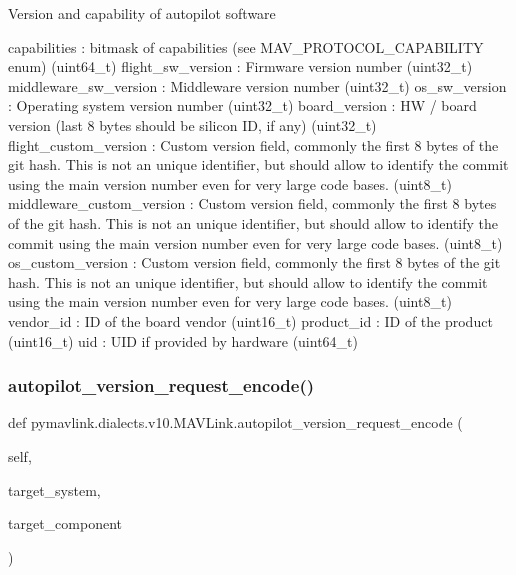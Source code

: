 \begin{DoxyVerb}Version and capability of autopilot software

capabilities              : bitmask of capabilities (see MAV_PROTOCOL_CAPABILITY enum) (uint64_t)
flight_sw_version         : Firmware version number (uint32_t)
middleware_sw_version        : Middleware version number (uint32_t)
os_sw_version             : Operating system version number (uint32_t)
board_version             : HW / board version (last 8 bytes should be silicon ID, if any) (uint32_t)
flight_custom_version        : Custom version field, commonly the first 8 bytes of the git hash. This is not an unique identifier, but should allow to identify the commit using the main version number even for very large code bases. (uint8_t)
middleware_custom_version        : Custom version field, commonly the first 8 bytes of the git hash. This is not an unique identifier, but should allow to identify the commit using the main version number even for very large code bases. (uint8_t)
os_custom_version         : Custom version field, commonly the first 8 bytes of the git hash. This is not an unique identifier, but should allow to identify the commit using the main version number even for very large code bases. (uint8_t)
vendor_id                 : ID of the board vendor (uint16_t)
product_id                : ID of the product (uint16_t)
uid                       : UID if provided by hardware (uint64_t)\end{DoxyVerb}
 \mbox{\label{classpymavlink_1_1dialects_1_1v10_1_1MAVLink_aa3ccba05a54765354981babef79475ff}} 
\subsubsection{\texorpdfstring{autopilot\+\_\+version\+\_\+request\+\_\+encode()}{autopilot\_version\_request\_encode()}}
{\footnotesize\ttfamily def pymavlink.\+dialects.\+v10.\+M\+A\+V\+Link.\+autopilot\+\_\+version\+\_\+request\+\_\+encode (\begin{DoxyParamCaption}\item[{}]{self,  }\item[{}]{target\+\_\+system,  }\item[{}]{target\+\_\+component }\end{DoxyParamCaption})}

